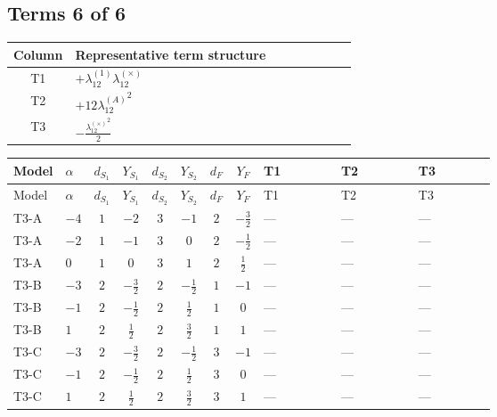 \documentclass[8pt]{article}
\begin{document}
\begin{landscape}
\subsection*{Terms 6 of 6}
\begin{center}
\begin{tabular}{@{}c >{\raggedright\arraybackslash}p{0.82\linewidth}@{}}
\toprule
Column & Representative term structure \\
\midrule
T1 & \(\displaystyle +{\lambda_{12}^{(1)}} {\lambda_{12}^{(\times)}}\) \\
\midrule
T2 & \(\displaystyle +12 {\lambda_{12}^{(A)}}^2\) \\
\midrule
T3 & \(\displaystyle -\frac{{\lambda_{12}^{(\times)}}^2}{2}\) \\
\midrule
\bottomrule
\end{tabular}
\end{center}
\smallskip
\tiny
\begin{longtable}{@{}llcccccc >{\raggedright\arraybackslash}p{0.21\linewidth} >{\raggedright\arraybackslash}p{0.21\linewidth} >{\raggedright\arraybackslash}p{0.21\linewidth}@{}}
\toprule
Model & $\alpha$ & $d_{S_1}$ & $Y_{S_1}$ & $d_{S_2}$ & $Y_{S_2}$ & $d_F$ & $Y_F$ & T1 & T2 & T3 \\
\midrule
\endfirsthead
\toprule
Model & $\alpha$ & $d_{S_1}$ & $Y_{S_1}$ & $d_{S_2}$ & $Y_{S_2}$ & $d_F$ & $Y_F$ & T1 & T2 & T3 \\
\midrule
\endhead
T3-A & $-4$ & $1$ & $-2$ & $3$ & $-1$ & $2$ & $-\frac{3}{2}$ & --- & --- & --- \\
\midrule
T3-A & $-2$ & $1$ & $-1$ & $3$ & $0$ & $2$ & $-\frac{1}{2}$ & --- & --- & --- \\
\midrule
T3-A & $0$ & $1$ & $0$ & $3$ & $1$ & $2$ & $\frac{1}{2}$ & --- & --- & --- \\
\midrule
T3-B & $-3$ & $2$ & $-\frac{3}{2}$ & $2$ & $-\frac{1}{2}$ & $1$ & $-1$ & --- & --- & --- \\
\midrule
T3-B & $-1$ & $2$ & $-\frac{1}{2}$ & $2$ & $\frac{1}{2}$ & $1$ & $0$ & --- & --- & --- \\
\midrule
T3-B & $1$ & $2$ & $\frac{1}{2}$ & $2$ & $\frac{3}{2}$ & $1$ & $1$ & --- & --- & --- \\
\midrule
T3-C & $-3$ & $2$ & $-\frac{3}{2}$ & $2$ & $-\frac{1}{2}$ & $3$ & $-1$ & --- & --- & --- \\
\midrule
T3-C & $-1$ & $2$ & $-\frac{1}{2}$ & $2$ & $\frac{1}{2}$ & $3$ & $0$ & --- & --- & --- \\
\midrule
T3-C & $1$ & $2$ & $\frac{1}{2}$ & $2$ & $\frac{3}{2}$ & $3$ & $1$ & --- & --- & --- \\

\end{longtable}
\end{landscape}
\end{document}

